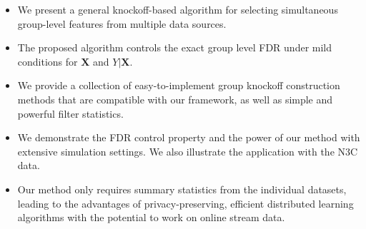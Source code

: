 \documentclass[11pt]{article}
\theoremstyle{plain}
\theoremstyle{definition}
\theoremstyle{remark}
\newcommand{\X}{\mathbf{X}}
\newcommand{\0}{\mathbf{0}}
\newcommand{\Xp}{\widetilde{\X}}
\begin{document}
\begin{itemize}
    \item We present a general knockoff-based algorithm for selecting simultaneous group-level features from multiple data sources.
    \item The proposed algorithm controls the exact group level FDR under mild conditions for $\X$ and $Y|\X$.
    \item We provide a collection of easy-to-implement group knockoff construction methods that are compatible with our framework, as well as simple and powerful filter statistics.
    \item We demonstrate the FDR control property and the power of our method with extensive simulation settings. We also illustrate the application with the N3C data.
    \item Our method only requires summary statistics from the individual datasets, leading to the advantages of privacy-preserving, efficient distributed learning algorithms with the potential to work on online stream data. 
\end{itemize}
\begin{comment}
\subsection{Group knockoff construction}
The original knockoff construction requires that $\Xp^\top X = X^\top X - diag\{s\}$, that is, all off-diagonal entries are equal. When the features are highly correlated, 
this construction is only possible for vectors $s$ with extremely small entries; that is, $\Xp_j$ and $X_j$ are themselves highly correlated, and the knockoff filter
then loses power as it is hard to distinguish between a real signal $X_j$ and its knockoff copy $\Xp_j$. 

In a group-sparse setting, we will see that we can relax this requirement on $\Xp^\top X$, thereby improving our power. In particular, the best gain will be in 
situations where within-group correlations are high but between-group correlations are low; this may arise in many applications, for example, when genes related
to the same biological pathways are grouped together, we expect to see the largest correlations occuring within groups rather than between genes in different groups.
\end{comment}
\end{document}
